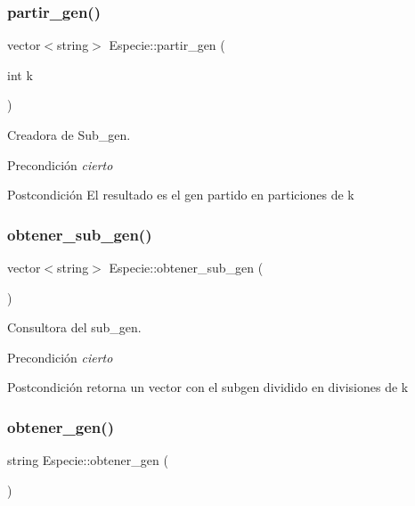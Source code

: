 \subsubsection{\texorpdfstring{partir\+\_\+gen()}{partir\_gen()}}
{\footnotesize\ttfamily vector$<$string$>$ Especie\+::partir\+\_\+gen (\begin{DoxyParamCaption}\item[{int}]{k }\end{DoxyParamCaption})}



Creadora de Sub\+\_\+gen. 

\begin{DoxyPrecond}{Precondición}
{\itshape cierto} 
\end{DoxyPrecond}
\begin{DoxyPostcond}{Postcondición}
El resultado es el gen partido en particiones de k 
\end{DoxyPostcond}
\mbox{\label{class_especie_a550a75c9df1055a7c14051efaed2d628}} 
\subsubsection{\texorpdfstring{obtener\+\_\+sub\+\_\+gen()}{obtener\_sub\_gen()}}
{\footnotesize\ttfamily vector$<$string$>$ Especie\+::obtener\+\_\+sub\+\_\+gen (\begin{DoxyParamCaption}{ }\end{DoxyParamCaption})}



Consultora del sub\+\_\+gen. 

\begin{DoxyPrecond}{Precondición}
{\itshape cierto} 
\end{DoxyPrecond}
\begin{DoxyPostcond}{Postcondición}
retorna un vector con el subgen dividido en divisiones de k 
\end{DoxyPostcond}
\mbox{\label{class_especie_abcbabd759ef608ce6901f8348dfca906}} 
\subsubsection{\texorpdfstring{obtener\+\_\+gen()}{obtener\_gen()}}
{\footnotesize\ttfamily string Especie\+::obtener\+\_\+gen (\begin{DoxyParamCaption}{ }\end{DoxyParamCaption})}



